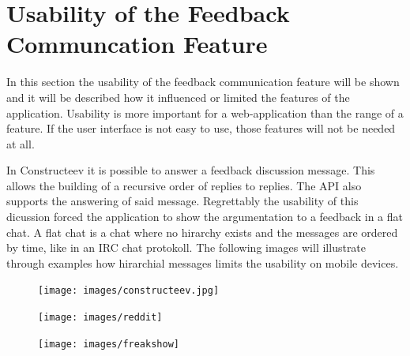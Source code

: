 \section{Usability of the Feedback Communcation Feature}
In this section the usability of the feedback communication feature will be shown and it will be described how it influenced or limited the features of the application. Usability is more important for a web-application than the range of a feature. If the user interface is not easy to use, those features will not be needed at all.

In Constructeev it is possible to answer a feedback discussion message. This allows the building of a recursive order of replies to replies. The API also supports the answering of said message. Regrettably the usability of this dicussion forced the application to show the argumentation to a feedback in a flat chat. A flat chat is a chat where no hirarchy exists and the messages are ordered by time, like in an IRC chat protokoll.  \cite{RFC1459} The following images will illustrate through examples how hirarchial messages limits the usability on mobile devices.
\begin{figure}[H]
\centering
\begin{minipage}{.5\textwidth}
  \centering
  \texttt{[image: images/constructeev.jpg]}
  \label{fig:test1}
\end{minipage}%
\begin{minipage}{.5\textwidth}
  \centering
  \texttt{[image: images/reddit]}
  \label{fig:test2}
\end{minipage}
\end{figure}
\begin{figure}[H]
\centering
  \texttt{[image: images/freakshow]}
  \label{fig:test2}
\end{figure}

\newpage
